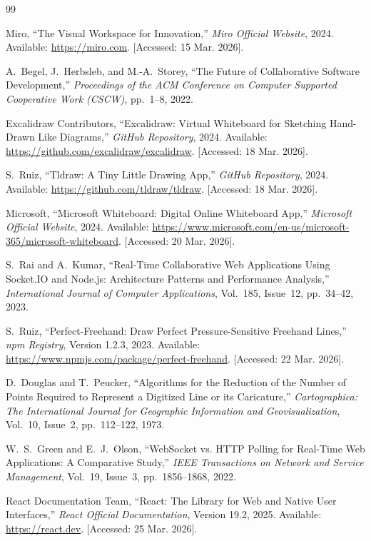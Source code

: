\documentclass[12pt,a4paper]{report}
\begin{document}
\begin{thebibliography}{99}

Miro, ``The Visual Workspace for Innovation,'' \textit{Miro Official Website}, 2024. Available: \url{https://miro.com}. [Accessed: 15 Mar. 2026].

A.~Begel, J.~Herbsleb, and M.-A.~Storey, ``The Future of Collaborative Software Development,'' \textit{Proceedings of the ACM Conference on Computer Supported Cooperative Work (CSCW)}, pp.~1--8, 2022.

Excalidraw Contributors, ``Excalidraw: Virtual Whiteboard for Sketching Hand-Drawn Like Diagrams,'' \textit{GitHub Repository}, 2024. Available: \url{https://github.com/excalidraw/excalidraw}. [Accessed: 18 Mar. 2026].

S.~Ruiz, ``Tldraw: A Tiny Little Drawing App,'' \textit{GitHub Repository}, 2024. Available: \url{https://github.com/tldraw/tldraw}. [Accessed: 18 Mar. 2026].

Microsoft, ``Microsoft Whiteboard: Digital Online Whiteboard App,'' \textit{Microsoft Official Website}, 2024. Available: \url{https://www.microsoft.com/en-us/microsoft-365/microsoft-whiteboard}. [Accessed: 20 Mar. 2026].

S.~Rai and A.~Kumar, ``Real-Time Collaborative Web Applications Using Socket.IO and Node.js: Architecture Patterns and Performance Analysis,'' \textit{International Journal of Computer Applications}, Vol.~185, Issue~12, pp.~34--42, 2023.

S.~Ruiz, ``Perfect-Freehand: Draw Perfect Pressure-Sensitive Freehand Lines,'' \textit{npm Registry}, Version 1.2.3, 2023. Available: \url{https://www.npmjs.com/package/perfect-freehand}. [Accessed: 22 Mar. 2026].

D.~Douglas and T.~Peucker, ``Algorithms for the Reduction of the Number of Points Required to Represent a Digitized Line or its Caricature,'' \textit{Cartographica: The International Journal for Geographic Information and Geovisualization}, Vol.~10, Issue~2, pp.~112--122, 1973.

W.~S.~Green and E.~J.~Olson, ``WebSocket vs. HTTP Polling for Real-Time Web Applications: A Comparative Study,'' \textit{IEEE Transactions on Network and Service Management}, Vol.~19, Issue~3, pp.~1856--1868, 2022.

React Documentation Team, ``React: The Library for Web and Native User Interfaces,'' \textit{React Official Documentation}, Version 19.2, 2025. Available: \url{https://react.dev}. [Accessed: 25 Mar. 2026].


\end{thebibliography}
\end{document}
